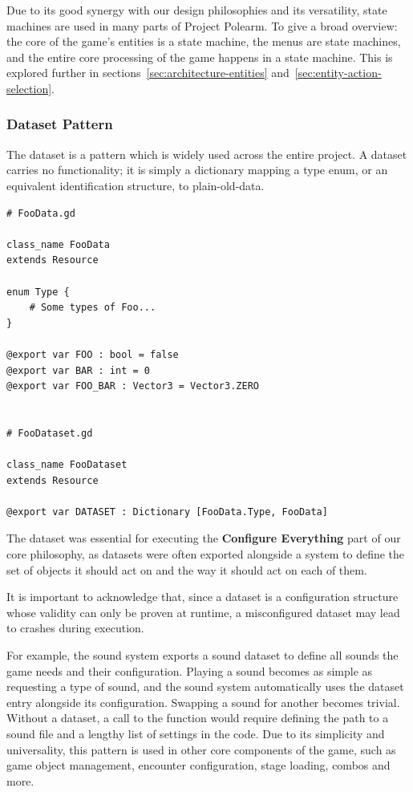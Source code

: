 \documentclass[../Main.tex]{subfiles}
\begin{document}
Due to its good synergy with our design philosophies and its versatility, state machines are used in many parts of Project Polearm. To give a broad overview: the core of the game's entities is a state machine, the menus are state machines, and the entire core processing of the game happens in a state machine. This is explored further in sections~\ref{sec:architecture-entities} and~\ref{sec:entity-action-selection}.

\subsubsection{Dataset Pattern}\label{sec:dataset-pattern}

The dataset is a pattern which is widely used across the entire project. A dataset carries no functionality; it is simply a dictionary mapping a type enum, or an equivalent identification structure, to plain-old-data.

\begin{verbatim}
# FooData.gd

class_name FooData
extends Resource

enum Type {
    # Some types of Foo...
}

@export var FOO : bool = false
@export var BAR : int = 0
@export var FOO_BAR : Vector3 = Vector3.ZERO


# FooDataset.gd

class_name FooDataset
extends Resource

@export var DATASET : Dictionary [FooData.Type, FooData]
\end{verbatim}

The dataset was essential for executing the \textbf{Configure Everything} part of our core philosophy, as datasets were often exported alongside a system to define the set of objects it should act on and the way it should act on each of them.

It is important to acknowledge that, since a dataset is a configuration structure whose validity can only be proven at runtime, a misconfigured dataset may lead to crashes during execution.

For example, the sound system exports a sound dataset to define all sounds the game needs and their configuration. Playing a sound becomes as simple as requesting a type of sound, and the sound system automatically uses the dataset entry alongside its configuration. Swapping a sound for another becomes trivial. Without a dataset, a call to the  function would require defining the path to a sound file and a lengthy list of settings in the code. Due to its simplicity and universality, this pattern is used in other core components of the game, such as game object management, encounter configuration, stage loading, combos and more.

\newpage
\end{document}
